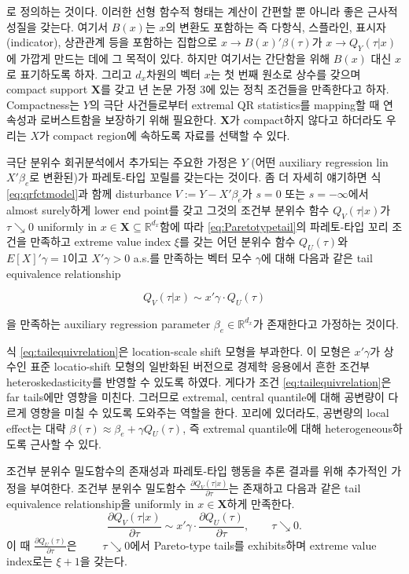 \documentclass[b5paper,]{scrbook}
\theoremstyle{plain}
\theoremstyle{definition}
\numberwithin{equation}{section}
\begin{document}
로 정의하는 것이다. 이러한 선형 함수적 형태는 계산이 간편할 뿐 아니라 좋은 근사적 성질을 갖는다. 여기서 \(B(x)\)는 \(x\)의 변환도 포함하는 즉 다항식, 스플라인, 표시자(indicator), 상관관계 등을 포함하는 집합으로 \(x\rightarrow B(x)'\beta(\tau)\)가 \(x\rightarrow Q_{Y}(\tau|x)\)에 가깝게 만드는 데에 그 목적이 있다. 하지만 여기서는 간단함을 위해 \(B(x)\) 대신 \(x\)로 표기하도록 하자. 그리고 \(d_{x}\)차원의 벡터 \(x\)는 첫 번째 원소로 상수를 갖으며 compact support \(\mathbf{X}\)를 갖고 \citep{Chernozhukov2011}년 논문 가정 3에 있는 정칙 조건들을 만족한다고 하자. Compactness는 \(Y\)의 극단 사건들로부터 extremal QR statistics를 mapping할 때 연속성과 로버스트함을 보장하기 위해 필요한다. \(\mathbf{X}\)가 compact하지 않다고 하더라도 우리는 \(X\)가 compact region에 속하도록 자료를 선택할 수 있다.

극단 분위수 회귀분석에서 추가되는 주요한 가정은 \(Y\) (어떤 auxiliary regression lin \(X'\beta_{e}\)로 변환된)가 파레토-타입 꼬릴를 갖는다는 것이다. 좀 더 자세히 얘기하면 식 \eqref{eq:qrfctmodel}과 함께 disturbance \(V:=Y-X'\beta_{e}\)가 \(s=0\) 또는 \(s=-\infty\)에서 almost surely하게 lower end point를 갖고 그것의 조건부 분위수 함수 \(Q_{V}(\tau|x)\)가 \(\tau\searrow 0\) uniformly in \(x\in\mathbf{X}\subseteq \mathbb{R}^{d_{x}}\)함에 따라 \eqref{eq:Paretotypetail}의 파레토-타입 꼬리 조건을 만족하고 extreme value index \(\xi\)를 갖는 어던 분위수 함수 \(Q_{U}(\tau)\)와 \(E[X]'\gamma=1\)이고 \(X'\gamma >0\) a.s.를 만족하는 벡터 모수 \(\gamma\)에 대해 다음과 같은 tail equivalence relationship

\begin{equation}
Q_{V}(\tau|x) \sim x'\gamma\cdot Q_{U}(\tau)
\label{eq:tailequivrelation}
\end{equation}

을 만족하는 auxiliary regression parameter \(\beta_{e}\in\mathbb{R}^{d_{x}}\)가 존재한다고 가정하는 것이다.

식 \eqref{eq:tailequivrelation}은 location-scale shift 모형을 부과한다. 이 모형은 \(x'\gamma\)가 상수인 표준 locatio-shift 모형의 일반화된 버전으로 경제학 응용에서 흔한 조건부 heteroskedasticity를 반영할 수 있도록 하였다. 게다가 조건 \eqref{eq:tailequivrelation}은 far tails에만 영향을 미친다. 그러므로 extremal, central quantile에 대해 공변량이 다르게 영향을 미칠 수 있도록 도와주는 역할을 한다. 꼬리에 있더라도, 공변량의 local effect는 대략 \(\beta(\tau) \approx \beta_{e} +\gamma Q_{U}(\tau)\), 즉 extremal quantile에 대해 heterogeneous하도록 근사할 수 있다.

조건부 분위수 밀도함수의 존재성과 파레토-타입 행동을 추론 결과를 위해 추가적인 가정을 부여한다. 조건부 분위수 밀도함수 \(\frac{\partial Q_{V}(\tau|x)}{\partial \tau}\)는 존재하고 다음과 같은 tail equivalence relationship을 uniformly in \(x\in\mathbf{X}\)하게 만족한다.
\[\frac{\partial Q_{V}(\tau|x)}{\partial \tau} \sim x' \gamma \cdot  \frac{\partial Q_{U}(\tau)}{\partial \tau}, \qquad{\tau \searrow 0}.\]
이 때 \(\frac{\partial Q_{U}(\tau)}{\partial \tau}\)은 \(\qquad{\tau \searrow 0}\)에서 Pareto-type tails를 exhibits하며 extreme value index로는 \(\xi+1\)을 갖는다.
\end{document}
